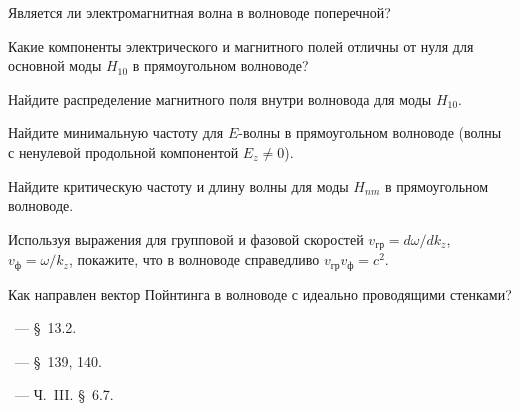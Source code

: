 \begin{lab:questions} 
    
    \item Является ли электромагнитная волна в волноводе поперечной?
    
    \item Какие компоненты электрического и магнитного полей отличны от нуля
для основной моды $H_{10}$ в прямоугольном волноводе?

    \item Найдите распределение магнитного поля внутри волновода для моды $H_{10}$.

    \item Найдите минимальную частоту для $E$-волны в прямоугольном волноводе (волны с ненулевой
    продольной компонентой $E_z\ne 0$).
    
    \item Найдите критическую частоту и длину волны для моды $H_{nm}$ в прямоугольном волноводе.
    
    \item Используя выражения для групповой и фазовой
    скоростей $v_{гр}=d\omega/dk_z$, $v_{\text{ф}}=\omega/k_z$, покажите, что в
    волноводе справедливо $v_{гр}v_{\text{ф}}=c^2$.
    
    \item Как направлен вектор Пойнтинга в волноводе с идеально проводящими стенками?
\end{lab:questions}


\begin{lab:literature} 
    \item \Kirichenko~--- \S~13.2.
    
    \item \SivuhinIII~--- \S~139, 140.
    
    \item \KingLokOlh~--- Ч.~III. \S~6.7.
        
\end{lab:literature}
